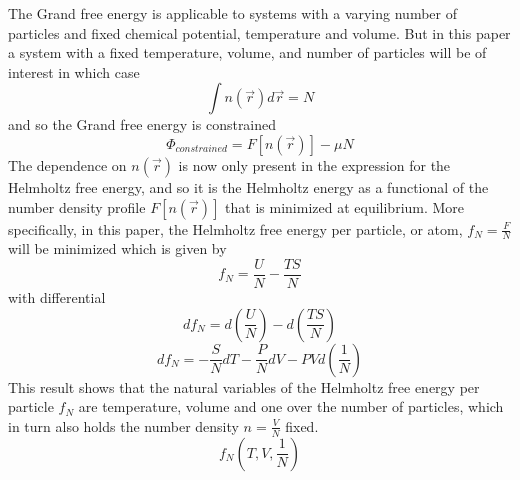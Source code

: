 \documentclass[double,12pt]{beavtex}
\begin{document}
The Grand free energy is applicable to systems with a varying number of 
particles and fixed chemical potential, temperature and volume. But in 
this paper a system with a fixed temperature, volume, and number of 
particles will be of interest in which case
\begin{equation}\int n(\vec r)d\vec{r}=N\end{equation}
and so the Grand free energy is constrained
\begin{equation}\label{GrandFE}\Phi_{constrained}= F[n(\vec r)]-\mu N\end{equation}
The dependence on $n(\vec r)$ is now only present in the expression for 
the Helmholtz free energy, and so it is the Helmholtz energy as a functional 
of the number density profile $F[n(\vec r)]$ that is minimized at equilibrium. 
More specifically, in this paper, the Helmholtz free energy per particle, 
or atom,  $f_N=\frac{F}{N}$ will be minimized which is given by
\begin{equation}f_N=\frac{U}{N}-\frac{TS}{N}\end{equation}
with differential
\begin{equation}\label{usetoshowmin}df_N=d\left(\frac{U}{N}\right)-d\left(\frac{TS}{N}\right)\end{equation}
\begin{equation}df_N=-\frac{S}{N}dT-\frac{P}{N}dV-PVd\left(\frac{1}{N}\right)\end{equation}
This result shows that the natural variables of the Helmholtz free energy 
per particle $f_N$ are temperature, volume and one over the number of 
particles, which in turn also holds the number density $n=\frac{V}{N}$ fixed. 
\begin{equation}f_N(T,V, \frac{1}{N})\end{equation}
\end{document}
